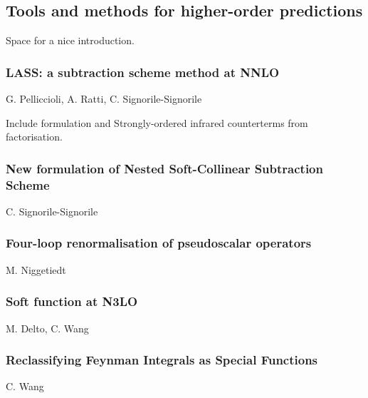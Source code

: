 \documentclass{FBR_Bericht_2025}
\begin{document}
\subsection{Tools and methods for higher-order predictions}
\begin{refsection}
Space for a nice introduction.
%
\subsubsection{LASS: a subtraction scheme method at NNLO}
\begin{Namen}
G. Pelliccioli, A. Ratti, C. Signorile-Signorile
\end{Namen}
Include formulation and Strongly-ordered infrared counterterms from factorisation.
%
\subsubsection{New formulation of Nested Soft-Collinear Subtraction Scheme}
\begin{Namen}
C. Signorile-Signorile
\end{Namen}
%
\subsubsection{Four-loop renormalisation of pseudoscalar operators}
\begin{Namen}
M. Niggetiedt
\end{Namen}
%
\subsubsection{Soft function at N3LO}
\begin{Namen}
M. Delto, C. Wang
\end{Namen}
%
\subsubsection{Reclassifying Feynman Integrals as Special Functions}
\begin{Namen}
C. Wang
\end{Namen}
%
\printbibliography[heading=subbibliography]
\end{refsection}

\end{document}
